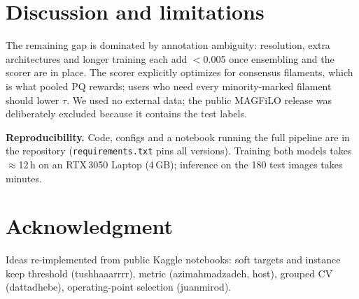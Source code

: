 \documentclass[conference]{IEEEtran}
\begin{document}
\section{Discussion and limitations}
The remaining gap is dominated by annotation ambiguity: resolution, extra architectures and longer
training each add $<$0.005 once ensembling and the scorer are in place. The scorer explicitly
optimizes for consensus filaments, which is what pooled PQ rewards; users who need every
minority-marked filament should lower $\tau$. We used no external data; the public MAGFiLO
release was deliberately excluded because it contains the test labels.

\textbf{Reproducibility.} Code, configs and a notebook running the full pipeline are in the
repository (\texttt{requirements.txt} pins all versions). Training both models takes
$\approx$12\,h on an RTX\,3050 Laptop (4\,GB); inference on the 180 test images takes minutes.

\section*{Acknowledgment}
Ideas re-implemented from public Kaggle notebooks: soft targets and instance keep threshold
(tushhaaarrrr), metric (azimahmadzadeh, host), grouped CV (dattadhebe), operating-point
selection (juanmirod).
\end{document}
